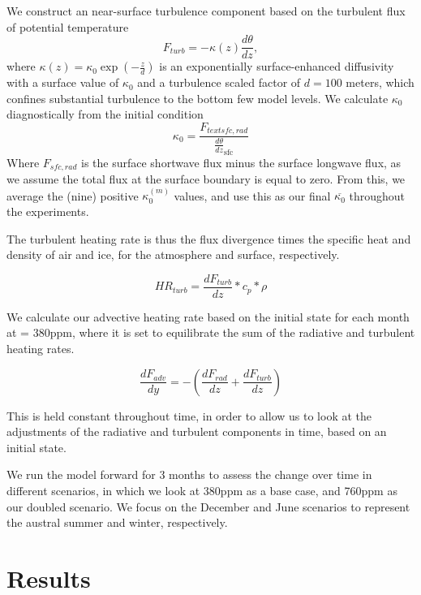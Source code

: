 \documentclass[12]{article}
\begin{document}
We construct an near-surface turbulence component based on the turbulent flux of potential temperature
\begin{equation}
    F_{turb} = -\kappa(z) \frac{d\theta}{dz},
\end{equation}
where $\kappa(z) = \kappa_0 \exp(-\frac{z}{d})$ is an exponentially surface-enhanced diffusivity with a surface value of $\kappa_0$ and a turbulence scaled factor of $d = 100$ meters, which confines substantial turbulence to the bottom few model levels. We calculate $\kappa_0$ diagnostically from the initial condition
\begin{equation}
    \kappa_0 = \frac{F_{text{sfc, rad}}}{\frac{d\theta}{dz}_{\text{sfc}}}
\end{equation}
Where $F_{sfc, rad}$ is the surface shortwave flux minus the surface longwave flux, as we assume the total flux at the surface boundary is equal to zero. From this, we average the (nine) positive $\kappa_0^{(m)}$ values, and use this as our final $\overline{\kappa_0}$ throughout the experiments.

The turbulent heating rate is thus the flux divergence times the specific heat and density of air and ice, for the atmosphere and surface, respectively.

\begin{equation}
    HR_{turb} = \frac{dF_{turb}}{dz} * c_p * \rho
\end{equation}

We calculate our advective heating rate based on the initial state for each month at  = 380ppm, where it is set to equilibrate the sum of the radiative and turbulent heating rates.

\begin{equation}
    \frac{dF_{adv}}{dy} = -(\frac{dF_{rad}}{dz} + \frac{dF_{turb}}{dz})
\end{equation}

This is held constant throughout time, in order to allow us to look at the adjustments of the radiative and turbulent components in time, based on an initial state. 

We run the model forward for 3 months to assess the change over time in different  scenarios, in which we look at 380ppm as a base case, and 760ppm as our doubled  scenario. We focus on the December and June scenarios to represent the austral summer and winter, respectively.

\section{Results}
\end{document}
